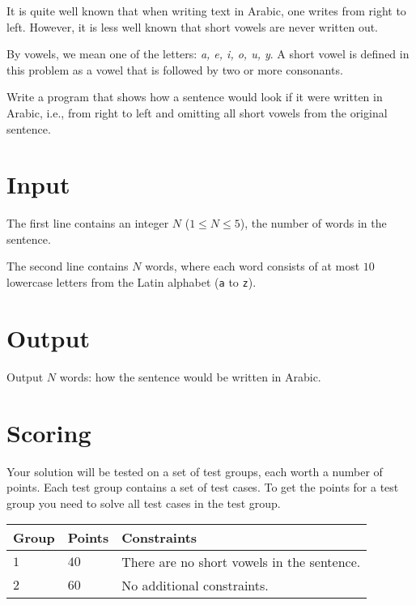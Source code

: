 \noindent
It is quite well known that when writing text in Arabic, one writes from right to left.
However, it is less well known that short vowels are never written out.

By vowels, we mean one of the letters: \textit{a, e, i, o, u, y}.
A short vowel is defined in this problem as a vowel that is followed by two or more consonants.

Write a program that shows how a sentence would look if it were written in Arabic, i.e., from right to left and omitting all short vowels from the original sentence.

\section*{Input}
The first line contains an integer $N$ ($1 \le N \le 5$), the number of words in the sentence.

The second line contains $N$ words, where each word consists of at most $10$ lowercase letters from the Latin alphabet (\texttt{a} to \texttt{z}).

\section*{Output}
Output $N$ words: how the sentence would be written in Arabic.

\section*{Scoring}
Your solution will be tested on a set of test groups, each worth a number of points. Each test group contains
a set of test cases. To get the points for a test group you need to solve all test cases in the test group.

\noindent
\begin{tabular}{| l | l | p{12cm} |}
  \hline
  \textbf{Group} & \textbf{Points} & \textbf{Constraints} \\ \hline
  $1$   & $40$        & There are no short vowels in the sentence. \\ \hline
  $2$   & $60$        & No additional constraints. \\ \hline
\end{tabular}